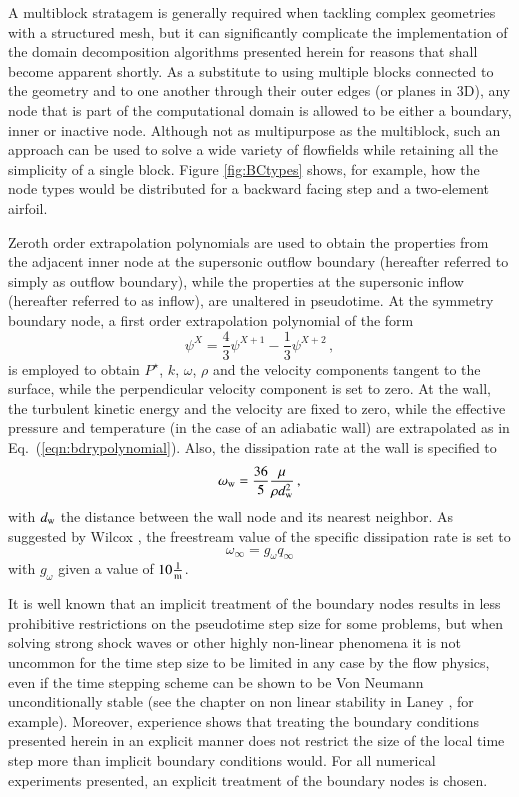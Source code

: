 A multiblock stratagem is generally required when tackling
complex geometries with a structured mesh, but it can significantly
complicate the implementation of the domain decomposition algorithms
presented herein for reasons that shall become apparent shortly.
As a substitute to using multiple blocks connected to the geometry
and to one another through their outer edges (or planes in 3D),
any node that is part of the computational domain is allowed to be either
a boundary, inner or inactive node. Although not as multipurpose
as the multiblock, such an approach can be used to solve a wide variety
of flowfields while retaining all the simplicity of a single block.
Figure \ref{fig:BCtypes} shows, for example, how the node types
would be distributed for a backward facing step and a two-element airfoil.

Zeroth order extrapolation polynomials are used to obtain the
properties from the adjacent inner node at the supersonic outflow
boundary (hereafter referred to simply as outflow boundary),
while the properties at the supersonic inflow (hereafter referred to
as inflow), are unaltered in pseudotime. At the symmetry boundary
node, a first order extrapolation polynomial of the form
%
\begin{equation}
  \psi^{X}=\frac{4}{3} \psi^{X+1} - \frac{1}{3} \psi^{X+2} \, ,
  \label{eqn:bdrypolynomial}
\end{equation}
%
is employed to obtain $P^\star$, $k$, $\omega$, $\rho$ and the velocity
components tangent
to the surface, while the perpendicular velocity component is set to zero.
At the wall, the turbulent kinetic energy and the velocity are fixed
to zero, while the effective pressure and temperature (in the case of an
adiabatic wall) are extrapolated as in Eq.~(\ref{eqn:bdrypolynomial}).
Also, the dissipation rate at the wall is specified to
%
\begin{equation}
  \omega_{\rm w}=\frac{36}{5} \frac{\mu}{\rho d_{\rm w}^2} \, ,
\end{equation}
%
with $d_{\rm w}$ the distance between the wall node and its nearest
neighbor. As suggested by Wilcox \cite{book:1994:wilcox}, the freestream value of
the specific dissipation rate is set to
%
\begin{equation}
  \omega_\infty=g_\omega q_\infty
  \label{eqn:g_omega}
\end{equation}
%
with $g_\omega$ given a value of $10 \frac{1}{\rm m}$.


It is well known that an implicit treatment of the boundary
nodes results in less prohibitive restrictions on the pseudotime step size for
some problems, but when solving strong shock waves or other highly non-linear
phenomena it is not uncommon for the time step size to be limited in any case
by the flow physics, even if the time stepping scheme can be shown
to be Von Neumann unconditionally stable (see the chapter on non linear
stability in Laney \cite{book:1998:laney}, for example).
Moreover, experience shows
that treating the boundary conditions presented herein in an
explicit manner does not restrict the size of the local time step more
than implicit boundary conditions would.  For all numerical experiments
presented, an explicit treatment of the boundary nodes is chosen.



